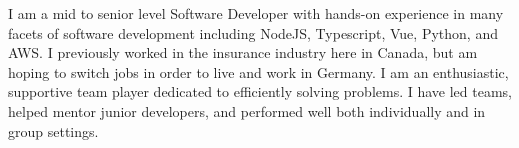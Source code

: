 
\begin{cvparagraph}
I am a mid to senior level Software Developer with hands-on experience in many facets of software development including
NodeJS, Typescript, Vue, Python, and AWS.  
I previously worked in the insurance industry here in Canada, but am hoping to switch jobs in order to live and work in Germany.
I am an enthusiastic, supportive team player dedicated to efficiently solving problems.
I have led teams, helped mentor junior developers, and performed well both individually and in group settings.
\end{cvparagraph}
